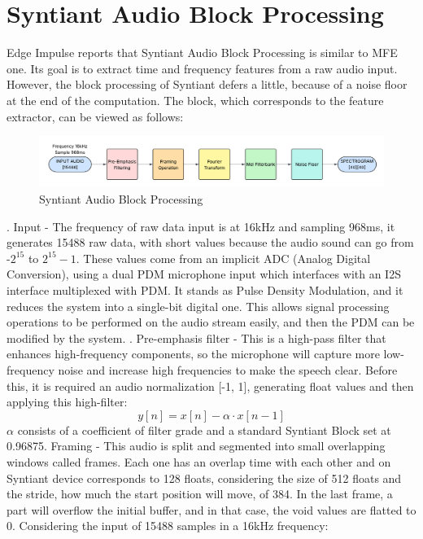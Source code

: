 \section{Syntiant Audio Block Processing}
\label{sec:audio}
Edge Impulse reports that Syntiant Audio Block Processing is similar to MFE one\cite{syntiant_audio_block}. Its goal is to extract time and frequency features from a raw audio input. However, the block processing of Syntiant defers a little, because of a noise floor at the end of the computation. The block, which corresponds to the feature extractor, can be viewed as follows:
\begin{figure}[!h]
    \centering
    \includegraphics[width=1.0\textwidth]{images/2.03 MFE Block Processing.png}
    \caption{Syntiant Audio Block Processing}
\end{figure}. Input - The frequency of raw data input is at 16kHz and sampling 968ms, it generates 15488 raw data, with short values because the audio sound can go from -$2^{15}$ to $2^{15}-1$. These values come from an implicit ADC (Analog Digital Conversion), using a dual PDM microphone input which interfaces with an I2S interface multiplexed with PDM\cite{PDM_module}. It stands as Pulse Density Modulation, and it reduces the system into a single-bit digital one. This allows signal processing operations to be performed on the audio stream easily, and then the PDM can be modified by the system.  . Pre-emphasis filter - This is a high-pass filter that enhances high-frequency components, so the microphone will capture more low-frequency noise and increase high frequencies to make the speech clear. Before this, it is required an audio normalization [-1, 1], generating float values and then applying this high-filter:
\begin{equation}
    y[n]=x[n]-\alpha\cdot x[n-1]
\end{equation}
$\alpha$ consists of a coefficient of filter grade and a standard Syntiant Block set at 0.96875. Framing - This audio is split and segmented into small overlapping windows called frames. Each one has an overlap time with each other and on Syntiant device corresponds to 128 floats, considering the size of 512 floats and the stride, how much the start position will move, of 384. In the last frame, a part will overflow the initial buffer, and in that case, the void values are flatted to 0. Considering the input of 15488 samples in a 16kHz frequency:\newline

